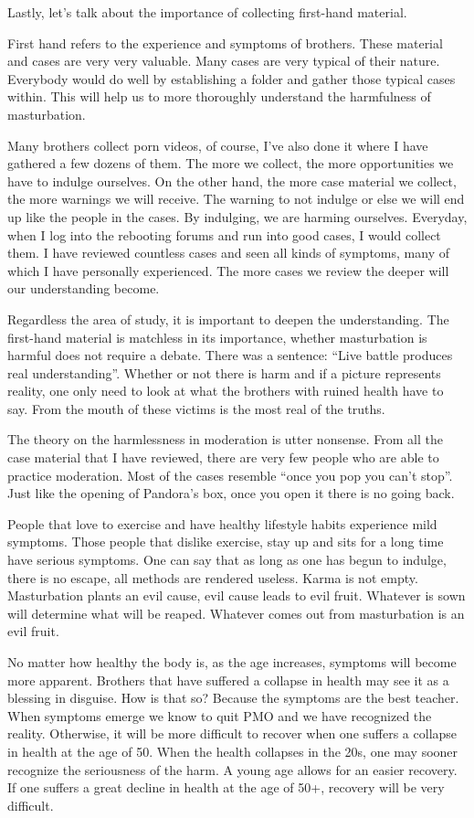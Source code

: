 \documentclass[
]{book}
\begin{document}
Lastly, let's talk about the importance of collecting first-hand material.

First hand refers to the experience and symptoms of brothers. These material and cases are very very valuable. Many cases are very typical of their nature. Everybody would do well by establishing a folder and gather those typical cases within. This will help us to more thoroughly understand the harmfulness of masturbation.

Many brothers collect porn videos, of course, I've also done it where I have gathered a few dozens of them. The more we collect, the more opportunities we have to indulge ourselves. On the other hand, the more case material we collect, the more warnings we will receive. The warning to not indulge or else we will end up like the people in the cases. By indulging, we are harming ourselves. Everyday, when I log into the rebooting forums and run into good cases, I would collect them. I have reviewed countless cases and seen all kinds of symptoms, many of which I have personally experienced. The more cases we review the deeper will our understanding become.

Regardless the area of study, it is important to deepen the understanding. The first-hand material is matchless in its importance, whether masturbation is harmful does not require a debate. There was a sentence: ``Live battle produces real understanding''. Whether or not there is harm and if a picture represents reality, one only need to look at what the brothers with ruined health have to say. From the mouth of these victims is the most real of the truths.

The theory on the harmlessness in moderation is utter nonsense. From all the case material that I have reviewed, there are very few people who are able to practice moderation. Most of the cases resemble ``once you pop you can't stop''. Just like the opening of Pandora's box, once you open it there is no going back.

People that love to exercise and have healthy lifestyle habits experience mild symptoms. Those people that dislike exercise, stay up and sits for a long time have serious symptoms. One can say that as long as one has begun to indulge, there is no escape, all methods are rendered useless. Karma is not empty. Masturbation plants an evil cause, evil cause leads to evil fruit. Whatever is sown will determine what will be reaped. Whatever comes out from masturbation is an evil fruit.

No matter how healthy the body is, as the age increases, symptoms will become more apparent. Brothers that have suffered a collapse in health may see it as a blessing in disguise. How is that so? Because the symptoms are the best teacher. When symptoms emerge we know to quit PMO and we have recognized the reality. Otherwise, it will be more difficult to recover when one suffers a collapse in health at the age of 50. When the health collapses in the 20s, one may sooner recognize the seriousness of the harm. A young age allows for an easier recovery. If one suffers a great decline in health at the age of 50+, recovery will be very difficult.
\end{document}

